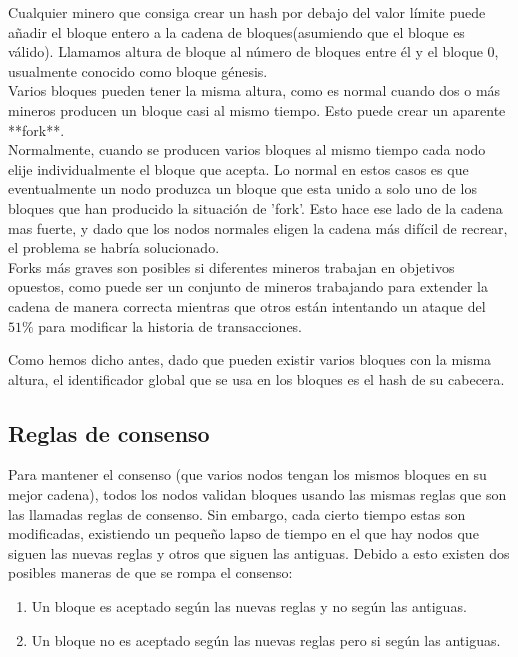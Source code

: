 \documentclass[11pt,a4paper]{article}
\begin{document}
Cualquier minero que consiga crear un hash por debajo del valor límite puede añadir el bloque entero a la cadena de bloques(asumiendo que el bloque es válido). Llamamos altura de bloque al número de bloques entre él y el bloque 0, usualmente conocido como bloque génesis.\\

Varios bloques pueden tener la misma altura, como es normal cuando dos o más mineros producen un bloque casi al mismo tiempo. Esto puede crear un aparente **fork**.\\

Normalmente, cuando se producen varios bloques al mismo tiempo cada nodo elije individualmente el bloque que acepta. Lo normal en estos casos es que eventualmente un nodo produzca un bloque que esta unido a solo uno de los bloques que han producido la situación de 'fork'. Esto hace ese lado de la cadena mas fuerte, y dado que los nodos normales eligen la cadena más difícil de recrear, el problema se habría solucionado.\\ 

Forks más graves son posibles si diferentes mineros trabajan en objetivos opuestos, como puede ser un conjunto de mineros trabajando para extender la cadena de manera correcta mientras que otros están intentando un ataque del $51\%$ para modificar la historia de transacciones.

Como hemos dicho antes, dado que pueden existir varios bloques con la misma altura, el identificador global que se usa en los bloques es el hash de su cabecera.\\

\subsection{Reglas de consenso}
Para mantener el consenso (que varios nodos tengan los mismos bloques en su mejor cadena), todos los nodos validan bloques usando las mismas reglas que son las llamadas reglas de consenso. Sin embargo, cada cierto tiempo estas son modificadas, existiendo un pequeño lapso de tiempo en el que hay nodos que siguen las nuevas reglas y otros que siguen las antiguas. Debido a esto existen dos posibles maneras de que se rompa el consenso:

\begin{enumerate}
	\item Un bloque es aceptado según las nuevas reglas y no según las antiguas.
	\item Un bloque no es aceptado según las nuevas reglas pero si según las antiguas. 
\end{enumerate}
\end{document}
